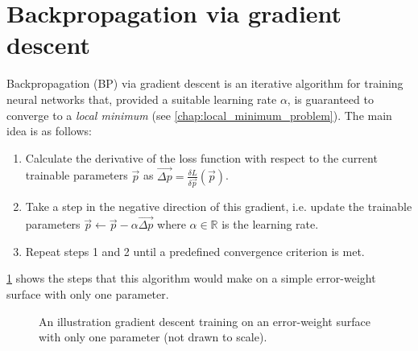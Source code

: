 \section{Backpropagation via gradient descent}
\label{sec:backpropagation}
Backpropagation (BP) via gradient descent is an iterative algorithm for training neural networks that, provided a suitable learning rate $\alpha$, is guaranteed to converge to a \textit{local minimum} (see \ref{chap:local_minimum_problem}).
The main idea is as follows:
\begin{enumerate}
    \item Calculate the derivative of the loss function with respect to the current trainable parameters $\vec{p}$ as
        $\vec{\Delta p} = \frac{\delta L}{\delta \vec{p}}\left(\vec{p}\right)$.
    \item Take a step in the negative direction of this gradient, i.e. update the trainable parameters $\vec{p} \leftarrow \vec{p} - \alpha \vec{\Delta p}$ where $\alpha \in \mathbb{R}$ is the learning rate.
    \item Repeat steps 1 and 2 until a predefined convergence criterion is met.
\end{enumerate}
\ref{fig:gradient_descent_local_minimum} shows the steps that this algorithm would make on a simple error-weight surface with only one parameter.
\begin{figure}
    \centering
    \caption{An illustration gradient descent training on an error-weight surface with only one parameter (not drawn to scale).}
    \label{fig:gradient_descent_local_minimum}
\end{figure}

